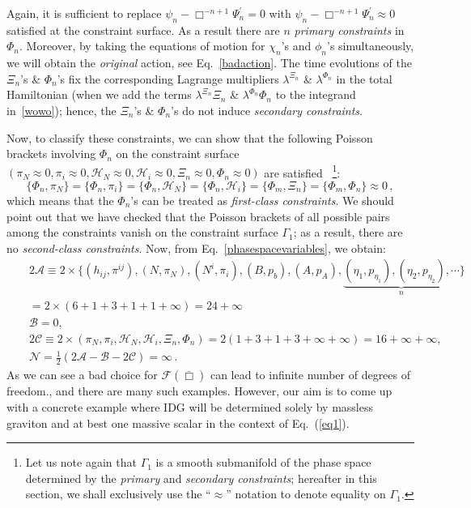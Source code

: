 \documentclass[a4paper,12pt]{article}
\newcommand{\bbox}{\bar{\Box}}
\newcommand{\la}{\lambda}
\newcommand{\Ga}{\Gamma}
\newcommand{\+}{^{\dagger}}
\newcommand{\2}{\frac{1}{2}}
\newcommand{\3}{\frac{1}{3}}
\newcommand{\4}{\frac{1}{4}}
\newcommand{\6}{\frac{1}{6}}
\newcommand{\8}{\frac{1}{8}}
\begin{document}
Again, it is sufficient to replace $\psi_n-\Box^{-n+1}\Psi_n^{'}=0$ with $\psi_n-\Box^{-n+1}\Psi_n^{'}\approx 0$ satisfied at the constraint surface.
As a result there are $n$ {\it primary constraints} in $\Phi_n$.  Moreover, by taking the equations of motion for $\chi_{n}$'s and $\phi_{n}$'s simultaneously, we will
obtain the {\it original} action, see Eq.~\eqref{badaction}. The time evolutions of the $\Xi_n$'s \& $\Phi_n$'s fix the corresponding Lagrange multipliers $\la^{\Xi_n}$ \& $\la^{\Phi_n}$ in the total Hamiltonian (when we add the terms $\la^{\Xi_n}\Xi_{n}$ \& $\la^{\Phi_n}\Phi_{n}$ to the integrand in~\eqref{wowo}); hence, the $\Xi_n$'s \& $\Phi_n$'s do not induce \textit{secondary constraints}.

Now, to classify these constraints, we can show that the following Poisson brackets involving $\Phi_n$ on the constraint surface $(\pi_N\approx0,\pi_i\approx0,\mathcal{H}_N\approx0,\mathcal{H}_{i}\approx0,\Xi_{n}\approx0,\Phi_n\approx0)$ are satisfied~
\footnote{ Let us note again that $\Ga_1$ is a smooth submanifold of the phase space determined by the {\it primary} and  {\it secondary constraints}; hereafter in this section, we shall exclusively use the ``$\approx$'' notation to denote equality on $\Ga_1$.}:
\begin{equation}
\{\Phi_n,\pi_N\}=\{\Phi_n,\pi_i\}=\{\Phi_n,\mathcal{H}_{N}\}=\{\Phi_n,\mathcal{H}_{i}\}=\{\Phi_m,\Xi _{n}\}=\{\Phi_m,\Phi_n\}\approx0\,,
\end{equation}
which means that the $\Phi_n$'s can be treated as {\it first-class constraints}. We should point out that we have checked that the Poisson brackets of all possible pairs among the constraints vanish on the constraint surface $\Ga_1$; as a result, there are no \textit{second-class constraints}. Now, from Eq.~\eqref{phasespacevariables}, we obtain:
\begin{eqnarray}
&&2\mathcal{A}\equiv2\times\bigg\{(h_{ij}, \pi^{ij}),(N,\pi_N),(N^i,
\pi_i),(B,p_b),(A,p_A),\underbrace{(\eta_1,p_{\eta_1}),(\eta_2,p_{\eta_2}),\cdots}_{n}\bigg\}
\nonumber\\&&=2\times(6+1+3+1+1+\infty)=24+\infty\nonumber\\
&&\mathcal{B}=0,\nonumber\\
&&2\mathcal{C}\equiv2\times(\pi_N,\pi_i,\mathcal{H}_N,\mathcal{H}_{i},\Xi
_{n},\Phi_n)=2(1+3+1+3+\infty+\infty)=16+\infty+\infty,\nonumber\\
&&\mathcal{N}=\frac{1}{2}(2\mathcal{A}-\mathcal{B}-2\mathcal{C})=\infty\,.
\end{eqnarray}
As we can see a bad choice for $\mathcal{F}(\bbox)$ can lead to infinite number of degrees of freedom., and there are many such examples. However, our aim is to
come up with a concrete example where IDG will be determined solely by massless graviton and at best one massive scalar in the context of Eq.~(\ref{eq1}).
\end{document}
